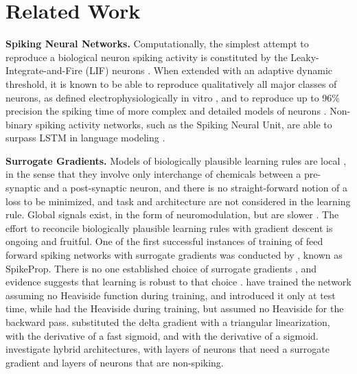\section{Related Work}



\textbf{Spiking Neural Networks.} Computationally, the simplest attempt to reproduce a biological neuron spiking activity is constituted by the  Leaky-Integrate-and-Fire (LIF) neurons \cite{lapique1907recherches}. When extended with an adaptive dynamic threshold, it is known to be able to reproduce
qualitatively all major classes of neurons, as defined electrophysiologically in vitro  \cite{izhikevich2003simple}, and to reproduce up to 96\% precision the spiking time of more complex and detailed models of neurons \cite{brette2005adaptive}.
Non-binary spiking activity networks, such as the Spiking Neural Unit, are able to surpass LSTM in language modeling \cite{wozniak2020deep}.

\noindent\textbf{Surrogate Gradients.} 
Models of biologically plausible learning rules are local \cite{7966072, FELDMAN2020127}, in the sense that they involve only interchange of chemicals between a pre-synaptic and a post-synaptic neuron, and there is no straight-forward notion of a loss to be minimized, and task and architecture are not considered in the learning rule. Global signals exist, in the form of neuromodulation, but are slower \cite{fremaux2016neuromodulated, legenstein2008learning, izhikevich2007solving}. The effort to reconcile biologically plausible learning rules with gradient descent is ongoing and fruitful.
One of the first successful instances of training of feed forward spiking networks with surrogate gradients was conducted by \cite{bohte2002error}, known as SpikeProp. 
There is no one established choice of surrogate gradients \cite{surrogate2019}, and evidence suggests that learning is robust to that choice \cite{zenke2021remarkable}. \cite{spikingbohte} have trained the network assuming no Heaviside function during training, and introduced it only at test time, while \cite{courbariaux2016binarized} had the Heaviside during training, but assumed no Heaviside for the backward pass. \cite{lsnn} substituted the delta gradient with a triangular linearization, \cite{zenke2018superspike} with the derivative of a fast sigmoid, and \cite{zenke2021remarkable} with the derivative of a sigmoid. \cite{yin2021accurate} investigate hybrid architectures, with layers of neurons that need a surrogate gradient and layers of neurons that are non-spiking.




